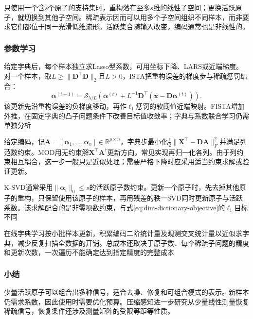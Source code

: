 只使用一个含$s$个原子的支持集时，重构落在至多$s$维的线性子空间；更换活跃原子，就切换到其他子空间。稀疏表示因而可以用多个子空间组织不同样本，而非要求它们都位于同一光滑低维流形。活跃集合随输入改变，编码通常也是非线性的。

\subsubsection{参数学习}
\label{sec:dim-sparse-coding-learning}

给定字典后，每个样本独立求Lasso型系数，可用坐标下降、LARS或近端梯度。对一个样本，取$L\geq\lVert\bm{D}^{\top}\bm{D}\rVert_2$且$L>0$，ISTA把重构误差的梯度步与稀疏惩罚结合：
\begin{equation}
  \bm{\alpha}^{(t+1)}
  =\mathcal{S}_{\lambda/L}\left(
      \bm{\alpha}^{(t)}
      +L^{-1}\bm{D}^{\top}
          (\bm{x}-\bm{D}\bm{\alpha}^{(t)})\right).
  \label{eq:dim-ista}
\end{equation}
该更新先沿重构误差的负梯度移动，再作$\ell_1$惩罚的软阈值近端映射。FISTA增加外推，在固定字典的凸子问题条件下改善目标值收敛率；字典与系数联合学习仍需单独分析

给定编码，记$\bm{A}=[\bm{\alpha}_1,\ldots,\bm{\alpha}_n]\in\mathbb{R}^{p\times n}$，字典步最小化$\frac12\lVert\bm{X}^{\top}-\bm{D}\bm{A}\rVert_F^2$并满足列范数约束。MOD用无约束解$\bm{X}^{\top}\bm{A}^{\dagger}$更新方向，常见实现再归一化各列。由于列约束相互耦合，这一步一般只是近似处理；需要严格下降时应采用适当约束求解或验证更新。

K-SVD通常采用$\lVert\bm{\alpha}_i\rVert_0\leq s$的活跃原子数约束。更新一个原子时，先去掉其他原子的重构，只保留使用该原子的样本，再用残差的秩一SVD同时更新原子与活跃系数。该求解配合的是非零项数约束，与式\eqref{eq:dim-dictionary-objective}的$\ell_1$目标不同

在线字典学习按小批样本更新，积累编码二阶统计量及观测交叉统计量以近似求字典，减少反复扫描全数据的开销。总成本还取决于原子数、每个稀疏子问题的精度和更新次数，一次遍历不能确定达到指定精度的完整成本

\subsubsection{小结}
\label{sec:dim-sparse-coding-summary}

少量活跃原子可以组合出多种信号，适合去噪、修复和可组合模式的表示。新样本仍需求系数，因此使用时需要优化预算。压缩感知进一步研究从少量线性测量恢复稀疏信号，恢复条件还涉及测量矩阵的受限等距等性质。


